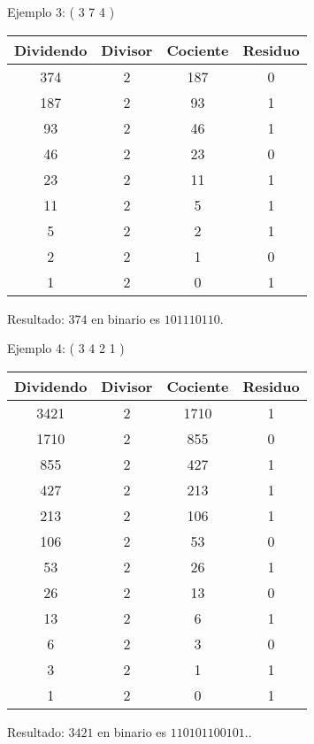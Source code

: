 \documentclass{IEEEcsmag}
\begin{document}
Ejemplo 3: ( 3 7 4 )  \newline
\newline \begin{tabular}{|c|c|c|c|}
  \hline
  Dividendo & Divisor & Cociente & Residuo \\
  \hline
  374 & 2 & 187 & 0 \\
  187 & 2 & 93 & 1 \\
  93 & 2 & 46 & 1 \\
  46 & 2 & 23 & 0 \\
  23 & 2 & 11 & 1 \\
  11 & 2 & 5 & 1 \\
  5 & 2 & 2 & 1 \\
  2 & 2 & 1 & 0 \\
  1 & 2 & 0 & 1 \\
  \hline
\end{tabular}
\newline

Resultado: \(374\) en binario es \(101110110\).
\newline


Ejemplo 4: ( 3 4 2 1 ) \newline 
\newline \begin{tabular}{|c|c|c|c|}
  \hline
  Dividendo & Divisor & Cociente & Residuo \\
  \hline
  3421 & 2 & 1710 & 1 \\
  1710 & 2 & 855 & 0 \\
  855 & 2 & 427 & 1 \\
  427 & 2 & 213 & 1 \\
  213 & 2 & 106 & 1 \\
  106 & 2 & 53 & 0 \\
  53 & 2 & 26 & 1 \\
  26 & 2 & 13 & 0 \\
  13 & 2 & 6 & 1 \\
  6 & 2 & 3 & 0 \\
  3 & 2 & 1 & 1 \\
  1 & 2 & 0 & 1 \\
  \hline
\end{tabular}
\newline

Resultado: \(3421\) en binario es \( 110101100101.\).
\clearpage










\end{document}

